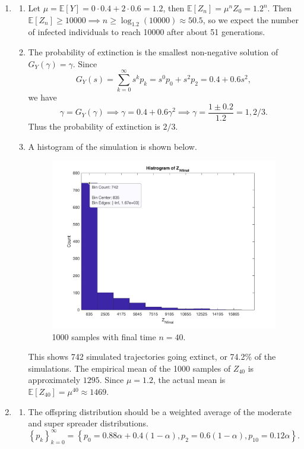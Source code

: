 \documentclass[10pt]{article}
\begin{document}
\begin{enumerate}
\item 
\begin{enumerate}
	\item Let $\mu = \mathbb{E}[Y] = 0\cdot 0.4 + 2\cdot 0.6 = 1.2$, then $\mathbb{E}[Z_n]= \mu^n Z_0 = 1.2^n$. Then $\mathbb{E}[Z_n] \geq 10000 \implies n \geq \log_{1.2}(10000) \approx 50.5$, so we expect the number of infected individuals to reach 10000 after about 51 generations.
	\item The probability of extinction is the smallest non-negative solution of $G_Y(\gamma)=\gamma$. Since
		\[
			G_Y(s) = \sum_{k=0}^{\infty} s^k p_k = s^0 p_0 + s^2 p_2 = 0.4 + 0.6s^2,
		\]
		we have
		\[
			\gamma=G_Y(\gamma) \implies \gamma=0.4+0.6\gamma^2 \implies \gamma=\frac{1\pm 0.2}{1.2} = 1, 2/3.
		\]
		Thus the probability of extinction is $2/3$.

	\item A histogram of the simulation is shown below.
		\begin{figure}[H]
			\centering
			\includegraphics[scale=0.5]{fig/fig1.pdf}
			\caption{1000 samples with final time  $n=40$.}
		\end{figure}

		This shows 742 simulated trajectories going extinct, or 74.2\% of the simulations. The empirical mean of the 1000 samples of $Z_{40}$ is approximately $1295$. Since $\mu = 1.2$, the actual mean is $\mathbb{E}[Z_{40}]=\mu^{40} \approx 1469.$
		
\end{enumerate}

\item 
\begin{enumerate}
	\item The offspring distribution should be a weighted average of the moderate and super spreader distributions.
		\[
			\left\{ p_k \right\}_{k=0}^\infty = \left\{ p_0 = 0.88\alpha+0.4(1-\alpha), p_2=0.6(1-\alpha), p_{10}=0.12\alpha \right\}.
		\] 
	

\end{enumerate}
\end{enumerate}
\end{document}
